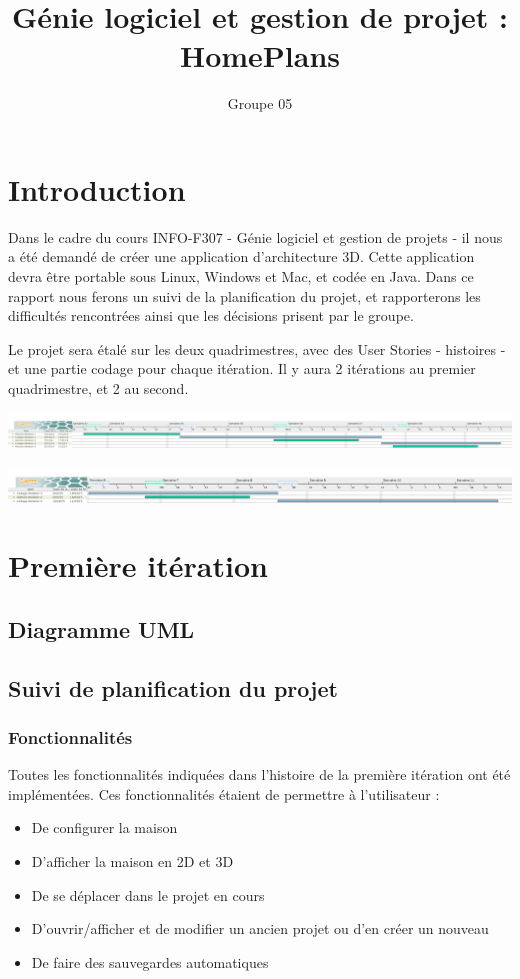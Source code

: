\documentclass[a4paper, 12pt]{report}
\title{Génie logiciel et gestion de projet : \\ HomePlans}
\author{Groupe 05}
\begin{document}
\maketitle
	\chapter{Introduction}
		Dans le cadre du cours INFO-F307 - Génie logiciel et gestion de projets - il nous a été demandé de créer une application d'architecture 3D. Cette application devra être portable sous Linux, Windows et Mac, et codée en Java. Dans ce rapport nous ferons un suivi de la planification du projet, et rapporterons les difficultés rencontrées ainsi que les décisions prisent par le groupe.
		
		Le projet sera étalé sur les deux quadrimestres, avec des User Stories - histoires - et une partie codage pour chaque itération. Il y aura 2 itérations au premier quadrimestre, et 2 au second.
		
		\begin{center}
			\includegraphics[scale=0.13]{images/gantt_projet_1er_quadri.png}
		\end{center}
		
		\begin{center}
			\includegraphics[scale=0.16]{images/gantt_projet_2eme_quadri.png}
		\end{center}
		
		
	\chapter{Première itération}
   		\section{Diagramme UML}
		\section{Suivi de planification du projet}
			\subsection{Fonctionnalités}
				Toutes les fonctionnalités indiquées dans l'histoire de la première itération ont été implémentées. Ces fonctionnalités étaient de permettre à l'utilisateur : 
				\begin{itemize}
					\item De configurer la maison
					\item D'afficher la maison en 2D et 3D
					\item De se déplacer dans le projet en cours
					\item D'ouvrir/afficher et de modifier un ancien projet ou d'en créer un nouveau
					\item De faire des sauvegardes automatiques
				\end{itemize}
				
\end{document}
